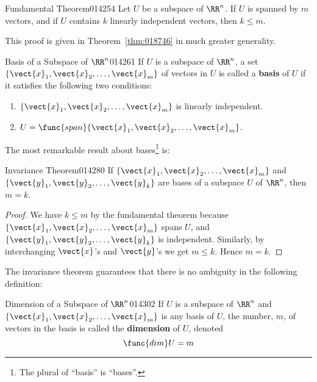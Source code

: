 \begin{theorem}{Fundamental Theorem}{014254} %
Let $U$ be a subspace of $\RR^n$. If $U$ is spanned by $m$ vectors, and if $U$ contains $k$ linearly independent vectors, then $k \leq m$.
\end{theorem}

\noindent This proof is given in Theorem~\ref{thm:018746} in much greater generality.

\begin{definition}{Basis of a Subspace of $\RR^n$}{014261} %
If $U$ is a subspace of $\RR^n$, a set $\{\vect{x}_{1}, \vect{x}_{2}, \dots, \vect{x}_{m}\}$ of vectors in $U$ is called a \textbf{basis} of $U$ if it satisfies the following two conditions:

\begin{enumerate}
\item $\{\vect{x}_{1}, \vect{x}_{2}, \dots, \vect{x}_{m}\}$ is linearly independent.

\item $U = \func{span}\{\vect{x}_{1}, \vect{x}_{2}, \dots, \vect{x}_{m}\}$.

\end{enumerate}
\end{definition}

\noindent The most remarkable result about bases\footnote{The plural of ``basis'' is ``bases''.}
 is:

\begin{theorem}{Invariance Theorem}{014280}
If $\{\vect{x}_{1}, \vect{x}_{2}, \dots, \vect{x}_{m}\}$ and $\{\vect{y}_{1}, \vect{y}_{2}, \dots, \vect{y}_{k}\}$ are bases of a subspace $U$ of $\RR^n$, then $m = k$.
\end{theorem}

\begin{proof}
We have $k \leq m$ by the fundamental theorem because $\{\vect{x}_{1}, \vect{x}_{2}, \dots, \vect{x}_{m}\}$ spans $U$, and $\{\vect{y}_{1}, \vect{y}_{2}, \dots, \vect{y}_{k}\}$ is independent. Similarly, by interchanging $\vect{x}$'s and $\vect{y}$'s we get $m \leq k$. Hence $m = k$.
\end{proof}

The invariance theorem guarantees that there is no ambiguity in the following definition:

\begin{definition}{Dimension of a Subspace of $\RR^n$}{014302} %
If $U$ is a subspace of $\RR^n$ and $\{\vect{x}_{1}, \vect{x}_{2}, \dots, \vect{x}_{m}\}$ is any basis
of $U$, the number, $m$, of vectors in the basis is called the
\textbf{dimension} of $U$, denoted
\begin{equation*}
\func{dim } U = m
\end{equation*}
\end{definition}

